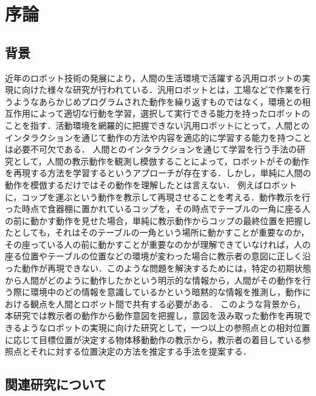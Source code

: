 ﻿%
\chapter{序論}

\section{背景}

近年のロボット技術の発展により，人間の生活環境で活躍する汎用ロボットの実現に向けた様々な研究が行われている．汎用ロボットとは，工場などで作業を行うようなあらかじめプログラムされた動作を繰り返すものではなく，環境との相互作用によって適切な行動を学習，選択して実行できる能力を持ったロボットのことを指す．活動環境を網羅的に把握できない汎用ロボットにとって，人間とのインタラクションを通じて動作の方法や内容を適応的に学習する能力を持つことは必要不可欠である．
人間とのインタラクションを通じて学習を行う手法の研究として，人間の教示動作を観測し模倣することによって，ロボットがその動作を再現する方法を学習するというアプローチが存在する．しかし，単純に人間の動作を模倣するだけではその動作を理解したとは言えない．
例えばロボットに，コップを運ぶという動作を教示して再現させることを考える．動作教示を行った時点で食器棚に置かれているコップを，その時点でテーブルの一角に座る人の前に動かす動作を見せた場合，単純に教示動作からコップの最終位置を把握したとしても，それはそのテーブルの一角という場所に動かすことが重要なのか，その座っている人の前に動かすことが重要なのかが理解できていなければ，人の座る位置やテーブルの位置などの環境が変わった場合に教示者の意図に正しく沿った動作が再現できない．このような問題を解決するためには，特定の初期状態から人間がどのように動作したかという明示的な情報から，人間がその動作を行う際に環境中のどの情報を意識しているかという暗黙的な情報を推測し，動作における観点を人間とロボット間で共有する必要がある．
このような背景から，本研究では教示者の動作から動作意図を把握し，意図を汲み取った動作を再現できるようなロボットの実現に向けた研究として，一つ以上の参照点との相対位置に応じて目標位置が決定する物体移動動作の教示から，教示者の着目している参照点とそれに対する位置決定の方法を推定する手法を提案する．

\section{関連研究について}

